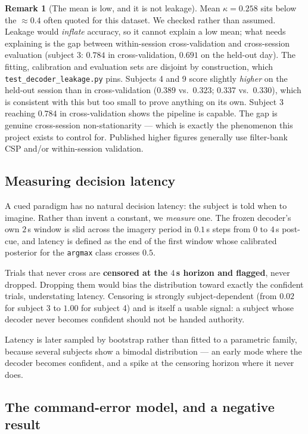 \documentclass[11pt,a4paper]{article}
\theoremstyle{plain}
\theoremstyle{definition}
\newtheorem{remark}{Remark}
\begin{document}
\begin{remark}[The mean is low, and it is not leakage]
Mean $\kappa = 0.258$ sits below the $\approx 0.4$ often quoted for this
dataset. We checked rather than assumed. Leakage would \emph{inflate} accuracy, so it
cannot explain a low mean; what needs explaining is the gap between
within-session cross-validation and cross-session evaluation (subject 3:
$0.784$ in cross-validation, $0.691$ on the held-out day). The fitting,
calibration and evaluation sets are disjoint by construction, which
\texttt{test\_decoder\_leakage.py} pins. Subjects 4 and 9 score slightly
\emph{higher} on the held-out session than in cross-validation ($0.389$
vs.\ $0.323$; $0.337$ vs.\ $0.330$), which is consistent with this but
too small to prove anything on its own. Subject 3 reaching $0.784$ in
cross-validation shows the pipeline is capable. The gap is genuine
cross-session non-stationarity --- which is exactly the phenomenon this
project exists to control for. Published higher figures generally use
filter-bank CSP and/or within-session validation.
\end{remark}

\subsection{Measuring decision latency}

A cued paradigm has no natural decision latency: the subject is told
when to imagine. Rather than invent a constant, we \emph{measure} one.
The frozen decoder's own $2$\,s window is slid across the imagery period
in $0.1$\,s steps from $0$ to $4$\,s post-cue, and latency is defined as
the end of the first window whose calibrated posterior for the
\texttt{argmax} class crosses $0.5$.

Trials that never cross are \textbf{censored at the $4$\,s horizon and
flagged}, never dropped. Dropping them would bias the distribution
toward exactly the confident trials, understating latency. Censoring is
strongly subject-dependent (from $0.02$ for subject 3 to $1.00$ for
subject 4) and is itself a usable signal: a subject whose decoder never
becomes confident should not be handed authority.

Latency is later sampled by bootstrap rather than fitted to a
parametric family, because several subjects show a bimodal
distribution --- an early mode where the decoder becomes confident, and
a spike at the censoring horizon where it never does.

\subsection{The command-error model, and a negative result}
\label{sec:markov}
\end{document}

